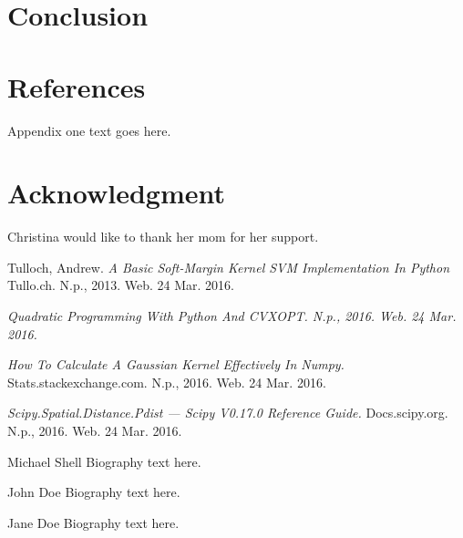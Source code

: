 \documentclass[journal]{IEEEtran}
\begin{document}
\section{Conclusion}

\section{References}

\appendices
Appendix one text goes here.

\section*{Acknowledgment}

Christina would like to thank her mom for her support.

\ifCLASSOPTIONcaptionsoff
  \newpage
\fi

\begin{thebibliography}{1}

  Tulloch, Andrew. \emph{A Basic Soft-Margin Kernel SVM Implementation In Python} Tullo.ch. N.p., 2013. Web. 24 Mar. 2016.

  \emph{Quadratic Programming With Python And CVXOPT. N.p., 2016. Web. 24 Mar. 2016.}

  \emph{How To Calculate A Gaussian Kernel Effectively In Numpy.} Stats.stackexchange.com. N.p., 2016. Web. 24 Mar. 2016.

  \emph{Scipy.Spatial.Distance.Pdist — Scipy V0.17.0 Reference Guide.} Docs.scipy.org. N.p., 2016. Web. 24 Mar. 2016.

\end{thebibliography}

\begin{IEEEbiography}{Michael Shell}
Biography text here.
\end{IEEEbiography}

\begin{IEEEbiographynophoto}{John Doe}
Biography text here.
\end{IEEEbiographynophoto}

\begin{IEEEbiographynophoto}{Jane Doe}
Biography text here.
\end{IEEEbiographynophoto}
\end{document}
